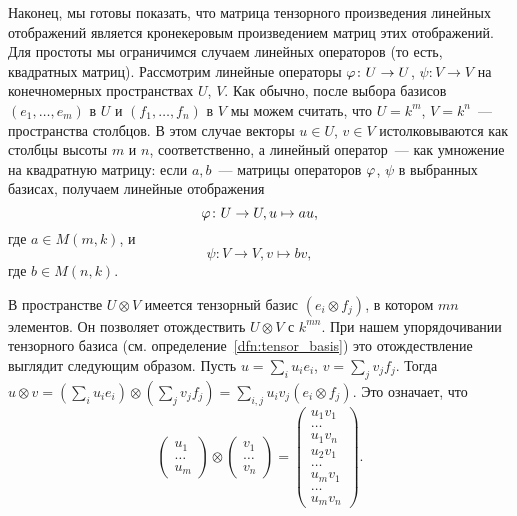 Наконец, мы готовы показать, что матрица тензорного произведения
линейных отображений является кронекеровым произведением матриц этих
отображений. Для простоты мы ограничимся случаем линейных операторов
(то есть, квадратных матриц). Рассмотрим линейные операторы
$\varphi\colon U\to U$, $\psi\colon V\to V$ на конечномерных пространствах
$U$, $V$. Как обычно, после выбора базисов $(e_1,\dots,e_m)$ в $U$ и
$(f_1,\dots,f_n)$ в $V$ мы можем считать, что $U = k^m$, $V=k^n$~---
пространства столбцов. В этом случае векторы $u\in U$, $v\in V$
истолковываются как столбцы высоты $m$ и $n$, соответственно, а
линейный оператор~--- как умножение на квадратную матрицу: если
$a,b$~--- матрицы операторов $\varphi$, $\psi$ в выбранных базисах,
получаем линейные отображения
$$
\varphi\colon U\to U, u\mapsto au,
$$
где $a\in M(m,k)$, и
$$
\psi\colon V\to V, v\mapsto bv,
$$
где $b\in M(n,k)$.

В пространстве $U\otimes V$ имеется тензорный базис $(e_i\otimes
f_j)$, в котором $mn$ элементов. Он позволяет отождествить $U\otimes
V$ с $k^{mn}$. При нашем упорядочивании тензорного базиса
(см. определение~\ref{dfn:tensor_basis}) это отождествление выглядит
следующим образом. Пусть $u = \sum_i u_i e_i$, $v = \sum_j v_j f_j$.
Тогда $u\otimes v = (\sum_i u_ie_i)\otimes (\sum_j v_jf_j)
 = \sum_{i,j}u_iv_j(e_i\otimes f_j)$. Это означает, что
$$
\begin{pmatrix}u_1\\ \dots \\ u_m\end{pmatrix}
\otimes
\begin{pmatrix}v_1\\ \dots \\ v_n\end{pmatrix}
=
\begin{pmatrix}u_1v_1\\ \dots \\ u_1v_n \\ u_2v_1 \\ \dots \\ u_mv_1
  \\ \dots \\ u_mv_n\end{pmatrix}.
$$

